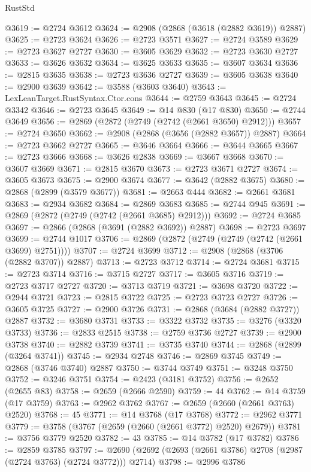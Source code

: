 \begin{lexlean}{RustStd}
\begin{coremodule}
@3619 := @2724 @3612
@3624 := @2908 (@2868 (@3618 (@2882 @3619)) @2887)
@3625 := @2723 @3624
@3626 := @2723 @3571
@3627 := @2724 @3589
@3629 := @2723 @3627 @2727
@3630 := @3605 @3629
@3632 := @2723 @3630 @2727
@3633 := @3626 @3632
@3634 := @3625 @3633
@3635 := @3607 @3634
@3636 := @2815 @3635
@3638 := @2723 @3636 @2727
@3639 := @3605 @3638
@3640 := @2900 @3639
@3642 := @3588 (@3603 @3640)
@3643 := LexLeanTarget.RustSyntax.Ctor.cons
@3644 := @2759 @3643
@3645 := @2724 @3342
@3646 := @2723 @3645
@3649 := @14 @830 (@17 @830)
@3650 := @2744 @3649
@3656 := @2869 (@2872 (@2749 (@2742 (@2661 @3650) @2912)))
@3657 := @2724 @3650
@3662 := @2908 (@2868 (@3656 (@2882 @3657)) @2887)
@3664 := @2723 @3662 @2727
@3665 := @3646 @3664
@3666 := @3644 @3665
@3667 := @2723 @3666
@3668 := @3626 @2838
@3669 := @3667 @3668
@3670 := @3607 @3669
@3671 := @2815 @3670
@3673 := @2723 @3671 @2727
@3674 := @3605 @3673
@3675 := @2900 @3674
@3677 := @3642 (@2882 @3675)
@3680 := @2868 (@2899 (@3579 @3677))
@3681 := @2663 @444
@3682 := @2661 @3681
@3683 := @2934 @3682
@3684 := @2869 @3683
@3685 := @2744 @945
@3691 := @2869 (@2872 (@2749 (@2742 (@2661 @3685) @2912)))
@3692 := @2724 @3685
@3697 := @2866 (@2868 (@3691 (@2882 @3692)) @2887)
@3698 := @2723 @3697
@3699 := @2744 @1017
@3706 := @2869 (@2872 (@2749 (@2749 (@2742 (@2661 @3699) @2751))))
@3707 := @2724 @3699
@3712 := @2908 (@2868 (@3706 (@2882 @3707)) @2887)
@3713 := @2723 @3712
@3714 := @2724 @3681
@3715 := @2723 @3714
@3716 := @3715 @2727
@3717 := @3605 @3716
@3719 := @2723 @3717 @2727
@3720 := @3713 @3719
@3721 := @3698 @3720
@3722 := @2944 @3721
@3723 := @2815 @3722
@3725 := @2723 @3723 @2727
@3726 := @3605 @3725
@3727 := @2900 @3726
@3731 := @2868 (@3684 (@2882 @3727)) @2887
@3732 := @3680 @3731
@3733 := @3322 @3732
@3735 := @3276 (@3320 @3733)
@3736 := @2833 @2515
@3738 := @2759 @3736 @2727
@3739 := @2900 @3738
@3740 := @2882 @3739
@3741 := @3735 @3740
@3744 := @2868 (@2899 (@3264 @3741))
@3745 := @2934 @2748
@3746 := @2869 @3745
@3749 := @2868 (@3746 @3740) @2887
@3750 := @3744 @3749
@3751 := @3248 @3750
@3752 := @3246 @3751
@3754 := @2423 (@3181 @3752)
@3756 := @2652 (@2655 @83)
@3758 := @2659 (@2666 @2590)
@3759 := 44
@3762 := @14 @3759 (@17 @3759)
@3763 := @2962 @3762
@3767 := @2659 (@2660 (@2661 @3763) @2520)
@3768 := 45
@3771 := @14 @3768 (@17 @3768)
@3772 := @2962 @3771
@3779 := @3758 (@3767 (@2659 (@2660 (@2661 @3772) @2520) @2679))
@3781 := @3756 @3779 @2520
@3782 := 43
@3785 := @14 @3782 (@17 @3782)
@3786 := @2859 @3785
@3797 := @2690 (@2692 (@2693 (@2661 @3786) @2708 (@2987 (@2724 @3763) (@2724 @3772))) @2714)
@3798 := @2996 @3786

\end{coremodule}
\end{lexlean}
